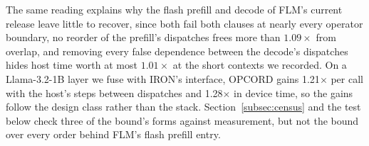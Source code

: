 The same reading explains why the flash prefill and decode of FLM's current release leave little to recover, since both fail both clauses at nearly every operator boundary, no reorder of the prefill's dispatches frees more than $1.09\times$ from overlap, and removing every false dependence between the decode's dispatches hides host time worth at most $1.01\times$ at the short contexts we recorded.
On a Llama-3.2-1B layer we fuse with IRON's interface, OPCORD gains 1.21$\times$ per call with the host's steps between dispatches and 1.28$\times$ in device time, so the gains follow the design class rather than the stack.
Section~\ref{subsec:census} and the test below check three of the bound's forms against measurement, but not the bound over every order behind FLM's flash prefill entry.

